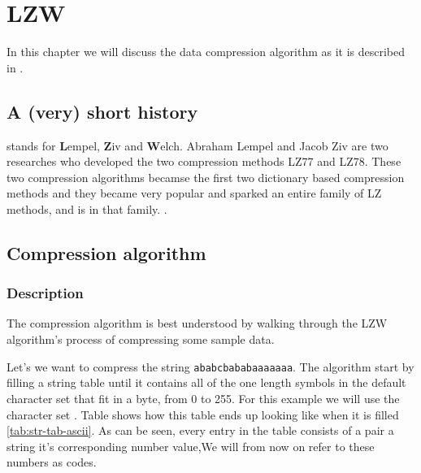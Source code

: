 \begin{comment}
  
\end{comment}

\chapter{LZW}
\label{ch:rle}

\begin{refsection}

In this chapter we will discuss the data compression algorithm \lzw{} as
it is described in
\cite{nelson89:_lzw_data_compr,Welch:1984:THD:1319729.1320134,Salomon:2004:DCC}.

\section{A (very) short history}

\lzw stands for \textbf{L}empel, \textbf{Z}iv and
\textbf{W}elch. Abraham Lempel and Jacob Ziv are two researches who
developed the two compression methods \textsc{LZ77} and
\textsc{LZ78}. These two compression algorithms becamse the first two
dictionary based compression methods and they became very popular and
sparked an entire family of \textsc{LZ} methods, and \lzw is in that family.
\cite{Salomon:2004:DCC}.

\section{Compression algorithm}

\subsection{Description}
\label{sec:lzw-desc}

The \lzw compression algorithm is best
understood by walking through the LZW algorithm's process of
compressing some sample data.

Let's we want to compress the string \texttt{ababcbababaaaaaaa}. The
algorithm start by filling a string table until it
contains all of the one length symbols in the default character set
that fit in a byte, from 0 to 255. For this example we will use the
character set \ascii \cite{rfc20}. Table shows how this table ends up looking like
when it is filled \ref{tab:str-tab-ascii}. As can be seen, every entry
in the table consists of a pair a string it's corresponding number
value,We will from now on refer to these numbers as codes.


\end{refsection}
